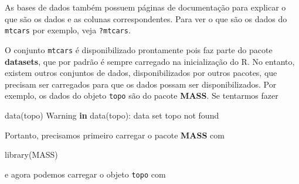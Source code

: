 \documentclass[
  10pt,
  a4paper]{book}
\newenvironment{Shaded}{\begin{snugshade}}{\end{snugshade}}
\newcommand{\ControlFlowTok}[1]{\textcolor[rgb]{0.13,0.29,0.53}{\textbf{#1}}}
\newcommand{\FunctionTok}[1]{\textcolor[rgb]{0.00,0.00,0.00}{#1}}
\newcommand{\NormalTok}[1]{#1}
\newcommand{\SpecialCharTok}[1]{\textcolor[rgb]{0.00,0.00,0.00}{#1}}
\newcommand{\StringTok}[1]{\textcolor[rgb]{0.31,0.60,0.02}{#1}}
\begin{document}
As bases de dados também possuem páginas de documentação para explicar
o que são os dados e as colunas correspondentes. Para ver o que são os
dados do \texttt{mtcars} por exemplo, veja \texttt{?mtcars}.

O conjunto \texttt{mtcars} é disponibilizado prontamente pois faz parte do
pacote \textbf{datasets}, que por padrão é sempre carregado na inicialização
do R. No entanto, existem outros conjuntos de dados, disponibilizados
por outros pacotes, que precisam ser carregados para que os dados possam
ser disponibilizados. Por exemplo, os dados do objeto \texttt{topo} são do
pacote \textbf{MASS}. Se tentarmos fazer

\begin{Shaded}
\begin{Highlighting}[]
\FunctionTok{data}\NormalTok{(topo)}
\NormalTok{Warning }\ControlFlowTok{in} \FunctionTok{data}\NormalTok{(topo)}\SpecialCharTok{:}\NormalTok{ data set }\StringTok{\textquotesingle{}topo\textquotesingle{}}\NormalTok{ not found}
\end{Highlighting}
\end{Shaded}

Portanto, precisamos primeiro carregar o pacote \textbf{MASS} com

\begin{Shaded}
\begin{Highlighting}[]
\FunctionTok{library}\NormalTok{(MASS)}
\end{Highlighting}
\end{Shaded}

e agora podemos carregar o objeto \texttt{topo} com
\end{document}
